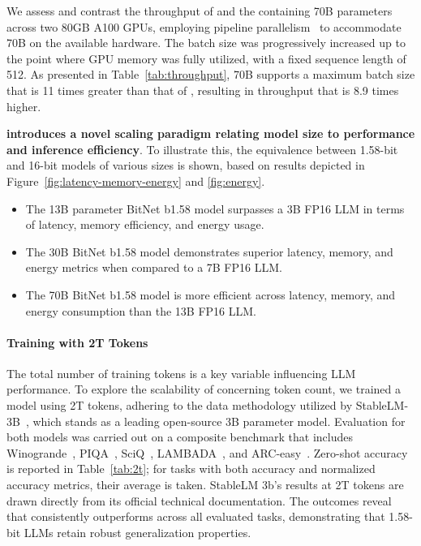 We assess and contrast the throughput of  and the  containing 70B parameters across two 80GB A100 GPUs, employing pipeline parallelism~\cite{gpipe} to accommodate  70B on the available hardware. The batch size was progressively increased up to the point where GPU memory was fully utilized, with a fixed sequence length of 512. As presented in Table~\ref{tab:throughput},  70B supports a maximum batch size that is 11 times greater than that of , resulting in throughput that is 8.9 times higher.

\textbf{ introduces a novel scaling paradigm relating model size to performance and inference efficiency}. To illustrate this, the equivalence between 1.58-bit and 16-bit models of various sizes is shown, based on results depicted in Figure~\ref{fig:latency-memory-energy} and \ref{fig:energy}.

\begin{itemize}
    \item The 13B parameter BitNet b1.58 model surpasses a 3B FP16 LLM in terms of latency, memory efficiency, and energy usage.
    \item The 30B BitNet b1.58 model demonstrates superior latency, memory, and energy metrics when compared to a 7B FP16 LLM.
    \item The 70B BitNet b1.58 model is more efficient across latency, memory, and energy consumption than the 13B FP16 LLM.
\end{itemize}

\paragraph{Training with 2T Tokens}

The total number of training tokens is a key variable influencing LLM performance. To explore the scalability of  concerning token count, we trained a  model using 2T tokens, adhering to the data methodology utilized by StableLM-3B~\cite{StableLM-3B-4E1T}, which stands as a leading open-source 3B parameter model. Evaluation for both models was carried out on a composite benchmark that includes Winogrande~\cite{winoGrande}, PIQA~\cite{piqa}, SciQ~\cite{sciq}, LAMBADA~\cite{lambada}, and ARC-easy~\cite{arc}. Zero-shot accuracy is reported in Table~\ref{tab:2t}; for tasks with both accuracy and normalized accuracy metrics, their average is taken. StableLM 3b's results at 2T tokens are drawn directly from its official technical documentation. The outcomes reveal that  consistently outperforms across all evaluated tasks, demonstrating that 1.58-bit LLMs retain robust generalization properties.

